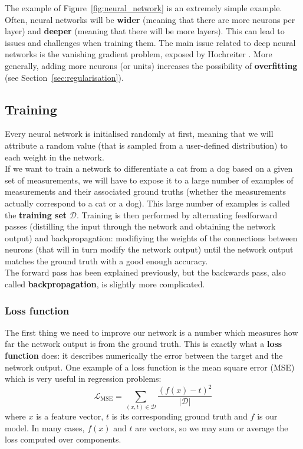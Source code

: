 The example of Figure~\ref{fig:neural_network} is an extremely simple example.
Often, neural networks will be \textbf{wider} (meaning that there are more
neurons per layer) and \textbf{deeper} (meaning that there will be more layers).
This can lead to issues and challenges when training them. The main issue
related to deep neural networks is the vanishing gradient problem, exposed
by Hochreiter \cite{vanishing_gradient}. More generally, adding more 
neurons (or units) increases the possibility of \textbf{overfitting} (see
Section~\ref{sec:regularisation}).

\subsection{Training}
\label{nn:training}
Every neural network is initialised randomly at first, meaning that we will
attribute a random value (that is sampled from a user-defined distribution)
to each weight in the network.\\

If we want to train a network to differentiate a cat from a dog based on a
given set of measurements, we will have to expose it to a large number of examples
of measurements and their associated ground truths 
(whether the measurements actually correspond to a cat or a dog). This large
number of examples is called the \textbf{training set} $\mathcal{D}$. 
 Training is
then performed by alternating feedforward passes (distilling the input through
the network and obtaining the network output) and backpropagation: modifiying 
the weights of the connections between neurons (that will in turn modify 
the network output) until the network output matches the ground truth with 
a good enough accuracy.\\

The forward pass has been explained previously, but the backwards pass, also
called \textbf{backpropagation}, is slightly more complicated.\\

\subsubsection{Loss function}
The first thing we need to improve our network is a number which measures
how far the network output is from the ground truth.
This is exactly what a \textbf{loss function}  does: 
it describes numerically the error between the target and the network output.
One example of a loss function is the mean square error (MSE)  which
is very useful in regression problems:
$$ \mathcal{L}_{\text{MSE}} = \sum\limits_{(x, t) \in \mathcal{D}}\frac{(f(x)-t)^2}{|\mathcal{D}|}$$
where $x$ is a feature vector, $t$ is its corresponding ground truth and $f$
is our model. In
many cases, $f(x)$ and $t$ are vectors, so we may sum or average the loss computed
over components.\\

